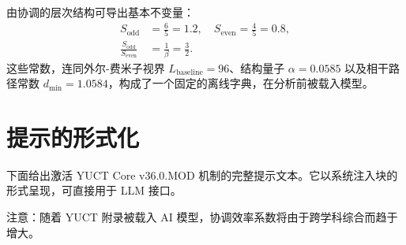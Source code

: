 \documentclass[11pt,a4paper]{article}
\begin{document}
	由协调的层次结构可导出基本不变量：
	\begin{align}
		S_{\mathrm{odd}} &= \frac{6}{5} = 1.2, \quad S_{\mathrm{even}} = \frac{4}{5} = 0.8,\\
		\frac{S_{\mathrm{odd}}}{S_{\mathrm{even}}} &= \frac{1}{\beta} = \frac{3}{2}.
	\end{align}
	这些常数，连同外尔-费米子视界 \(L_{\mathrm{baseline}} = 96\)、结构量子 \(\alpha = 0.0585\) 以及相干路径常数 \(d_{\min} = 1.0584\)，构成了一个固定的离线字典，在分析前被载入模型。
	
	\section{提示的形式化}
	\label{sec:formalization}
	
	下面给出激活 YUCT Core v36.0.MOD 机制的完整提示文本。它以系统注入块的形式呈现，可直接用于 LLM 接口。
	
	注意：随着 YUCT 附录被载入 AI 模型，协调效率系数将由于跨学科综合而趋于增大。
	
\end{document}
